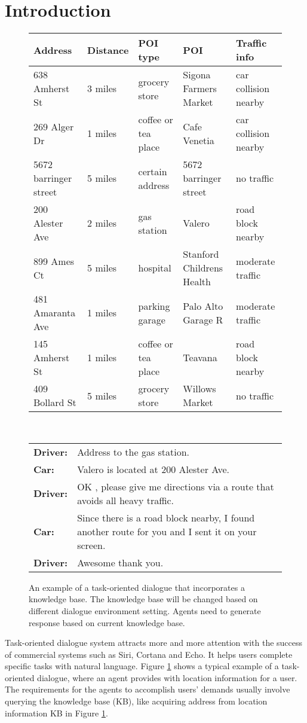 \documentclass[11pt]{article}
\begin{document}
\section{Introduction}
\begin{figure}[!tp]
	\centering
	\normalsize
	\label{fig1}
	\begin{tabular}{|l|l|l|l|l|}
		\hline\textbf{Address} & \textbf{Distance} & \textbf{POI type} & \textbf{POI} & \textbf{Traffic info} \\\hline
		638 Amherst St&3 miles&grocery store&Sigona Farmers Market&car collision nearby\\
		269 Alger Dr&1 miles&coffee or tea place&Cafe Venetia&car collision nearby\\
		5672 barringer street & 5 miles & certain address & 5672 barringer street & no traffic \\
		200 Alester Ave&2 miles&gas station&Valero&road block nearby\\
		899 Ames Ct&5 miles&hospital&Stanford Childrens Health&moderate traffic\\
		481 Amaranta Ave&1 miles&parking garage&Palo Alto Garage R&moderate traffic\\
		145 Amherst St&1 miles&coffee or tea place&Teavana&road block nearby\\
		409 Bollard St&5 miles&grocery store&Willows Market&no traffic\\\hline
	\end{tabular}
	\\
	\begin{tabular}{ll}
		\textbf{Driver:} & Address to the gas station.\\
		\textbf{Car:} & Valero is located at 200 Alester Ave.\\
		\textbf{Driver:} & OK , please give me directions via a route that avoids all heavy traffic.\\
		\textbf{Car:} & Since there is a road block nearby, I found another route for you and I sent it on your screen.\\
		\textbf{Driver:} & Awesome thank you.\\	
	\end{tabular}
	\caption{An example of a task-oriented dialogue that incorporates a knowledge base. The knowledge 
		base will be changed based on different dialogue environment setting. Agents need to generate 
		response based on current knowledge base.}
\end{figure}


	Task-oriented dialogue system attracts more and more attention with the success of commercial
systems such as Siri, Cortana and Echo. It helps users complete specific tasks with natural language. Figure \ref{fig1} shows a typical example of a task-oriented
dialogue, where an agent provides with location information for a user. The requirements for the
agents to accomplish users' demands usually involve querying the knowledge base (KB), like
acquiring address from location information KB in Figure \ref{fig1}.
\end{document}
